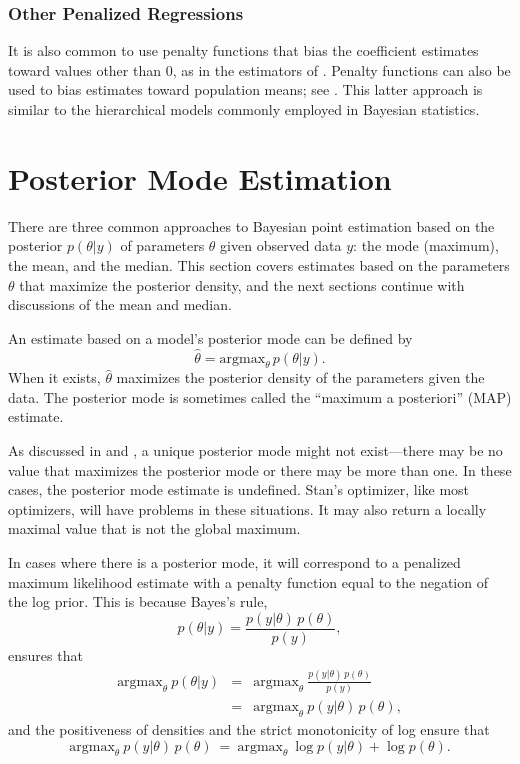 \subsubsection{Other Penalized Regressions}

It is also common to use penalty functions that bias the coefficient
estimates toward values other than 0, as in the estimators of
\cite{JamesStein:1961}.  Penalty functions can also be used to bias
estimates toward population means; see
\citep{EfronMorris:1975,Efron:2012}.  This latter approach is similar
to the hierarchical models commonly employed in Bayesian statistics.


\section{Posterior Mode Estimation}

There are three common approaches to Bayesian point estimation based
on the posterior $p(\theta|y)$ of parameters $\theta$ given observed
data $y$: the mode (maximum), the mean, and the median.  This section
covers estimates based on the parameters $\theta$ that maximize the
posterior density, and the next sections continue with discussions of
the mean and median.

An estimate based on a model's posterior mode can be defined by
%
\[
\hat{\theta} = \mbox{argmax}_{\theta} \, p(\theta|y).
\]
%
When it exists, $\hat{\theta}$ maximizes the posterior density of the
parameters given the data.  The posterior mode is sometimes called the
``maximum a posteriori'' (MAP) estimate.

As discussed in  and
, a unique posterior mode might not
exist---there may be no value that maximizes the posterior mode or
there may be more than one.  In these cases, the posterior mode
estimate is undefined.  Stan's optimizer, like most optimizers, will
have problems in these situations.  It may also return a locally
maximal value that is not the global maximum.

In cases where there is a posterior mode, it will correspond to a
penalized maximum likelihood estimate with a penalty function equal to
the negation of the log prior.  This is because Bayes's rule,
\[
p(\theta|y) = \frac{p(y|\theta) \, p(\theta)}{p(y)},
\]
ensures that
%
\begin{eqnarray*}
\mbox{argmax}_{\theta} \ p(\theta|y)
& = &
\mbox{argmax}_{\theta} \ \frac{p(y|\theta) \, p(\theta)}{p(y)}
\\[6pt]
& = &
\mbox{argmax}_{\theta} \ p(y|\theta) \, p(\theta),
\end{eqnarray*}
%
and the positiveness of densities and the strict monotonicity of log
ensure that
\[
\mbox{argmax}_{\theta} \ p(y|\theta) \, p(\theta)
\ = \
\mbox{argmax}_{\theta} \ \log p(y|\theta) + \log p(\theta).
\]
%

